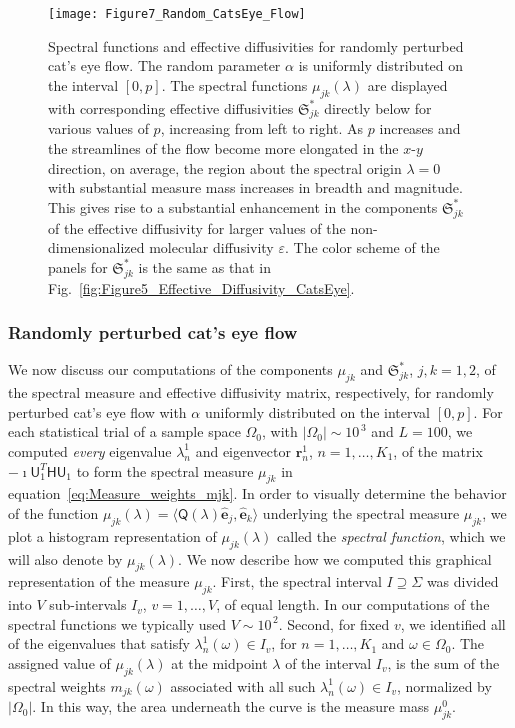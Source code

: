 \documentclass[english,12pt,jmp,graphicx]{revtex4-1}
\newcommand{\vece}{\boldsymbol{e}}
\newcommand{\figref}[1]{Fig.~\ref{#1}}
\newcommand{\Sg}{\mathfrak{S}}
\newcommand{\vecr}{\boldsymbol{r}}
\newcommand{\Hm}{\mathsf{H}}
\newcommand{\Um}{\mathsf{U}}
\newcommand{\Qm}{\mathsf{Q}}
\begin{document}
%
\begin{figure}[t]
  \centerline{\texttt{[image: Figure7\_Random\_CatsEye\_Flow]}} 
\caption{%
  Spectral functions and effective diffusivities for randomly
  perturbed cat's eye flow. The random parameter $\alpha$ is uniformly
  distributed on the interval $[0,p]$. The spectral functions
  $\mu_{jk}(\lambda)$ are displayed with corresponding effective diffusivities
  $\Sg^*_{jk}$ directly below for various values of $p$, increasing
  from left to right. As $p$ increases and the streamlines of the flow
  become more elongated in the $x$-$y$ direction, on average, the
  region about the spectral origin $\lambda=0$ with substantial measure mass
  increases in breadth and magnitude. This gives rise to a substantial
  enhancement in the components $\Sg^*_{jk}$ of the effective
  diffusivity for larger values of the non-dimensionalized molecular
  diffusivity $\varepsilon$. The 
  color scheme of the panels for $\Sg^*_{jk}$ is the same as that in
  \figref{fig:Figure5_Effective_Diffusivity_CatsEye}. 
        }
\label{fig:Figure7_Random_CatsEye_Flow}
\end{figure}
%


\subsubsection{Randomly perturbed cat's eye flow}
%
We now discuss our computations of the components $\mu_{jk}$ and
$\Sg^*_{jk}$, $j,k=1,2$, of the spectral measure and effective
diffusivity matrix, respectively, for randomly perturbed cat's eye
flow with $\alpha$ uniformly distributed on the interval $[0,p]$. For each
statistical trial of a sample space $\Omega_0$, with $|\Omega_0|
\sim10^{\,3}$
and $L=100$, we computed \emph{every}
eigenvalue $\lambda_n^1$ and eigenvector $\vecr_n^1$,
$n=1,\ldots,K_1$, of the matrix 
$-\imath\Um_1^T\Hm\Um_1$ to form the spectral measure $\mu_{jk}$
in equation~\eqref{eq:Measure_weights_mjk}. In order to visually
determine the behavior of the function
$\mu_{jk}(\lambda)=\langle\Qm(\lambda)\hat{\vece}_j,\hat{\vece}_k\rangle$ underlying the
spectral measure $\mu_{jk}$, we plot a histogram representation of
$\mu_{jk}(\lambda)$ called the \emph{spectral function}, which we will also
denote by $\mu_{jk}(\lambda)$. We now describe how we computed this graphical
representation of the measure $\mu_{jk}$. First, 
the spectral interval $I\supseteq\Sigma$ was divided into $V$ sub-intervals $I_v$,
$v=1,\ldots,V$, of equal length. In our
computations of the spectral functions we typically used $V\sim10^{\,2}$.
Second, for fixed $v$, we identified
all of the eigenvalues that satisfy $\lambda_n^1(\omega)\in I_v$, for
$n=1,\ldots,K_1$ and $\omega\in\Omega_0$. The assigned value of $\mu_{jk}(\lambda)$ at the
midpoint $\lambda$ of the interval $I_v$, is the sum of the spectral weights 
$m_{jk}(\omega)$ associated with all such $\lambda_n^1(\omega)\in
I_v$, normalized by $|\Omega_0|$. In this way, the area underneath the
curve is the measure mass $\mu_{jk}^0$. 
\end{document}
